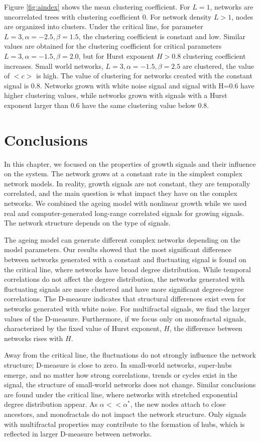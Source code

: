 Figure \ref{fig:aindex} shows the mean clustering coefficient. For $L=1$, networks are uncorrelated trees with clustering coefficient $0$. For network density $L>1$, nodes are organized into clusters. Under the critical line, for parameter $L=3, \alpha=-2.5, \beta=1.5 $, the clustering coefficient is constant and low. Similar values are obtained for the clustering coefficient for critical parameters $L=3, \alpha=-1.5, \beta=2.0$, but for Hurst exponent $H>0.8$ clustering coefficient increases. Small world networks,  $L=3, \alpha=-1.5, \beta=2.5$ are clustered, the value of $<c>$ is high.  The value of clustering for networks created with the constant signal is 0.8. Networks grown with white noise signal and signal with H=0.6 have higher clustering values, while networks grown with signals with a Hurst exponent larger than 0.6 have the same clustering value below 0.8. 

\section{Conclusions}

In this chapter, we focused on the properties of growth signals and their influence on the system. The network grows at a constant rate in the simplest complex network models. In reality, growth signals are not constant, they are temporally correlated, and the main question is what impact they have on the complex networks. We combined the ageing model with nonlinear growth while we used real and computer-generated long-range correlated signals for growing signals. The network structure depends on the type of signals.

The ageing model can generate different complex networks depending on the model parameters. Our results showed that the most significant difference between networks generated with a constant and fluctuating signal is found on the critical line, where networks have broad degree distribution. While temporal correlations do not affect the degree distribution, the networks generated with fluctuating signals are more clustered and have more significant degree-degree correlations. The D-measure indicates that structural differences exist even for networks generated with white noise. For multifractal signals, we find the larger values of the D-measure. Furthermore, if we focus only on monofractal signals, characterized by the fixed value of Hurst exponent, $H$, the difference between networks rises with $H$. 

Away from the critical line, the fluctuations do not strongly influence the network structure; D-measure is close to zero. In small-world networks, super-hubs emerge, and no matter how strong correlations, trends or cycles exist in the signal, the structure of small-world networks does not change. Similar conclusions are found under the critical line, where networks with stretched exponential degree distribution appear. As $\alpha<<\alpha^{*}$, the new nodes attach to close ancestors, and monofractals do not impact the network structure. Only signals with multifractal properties may contribute to the formation of hubs, which is reflected in larger D-measure between networks. 

